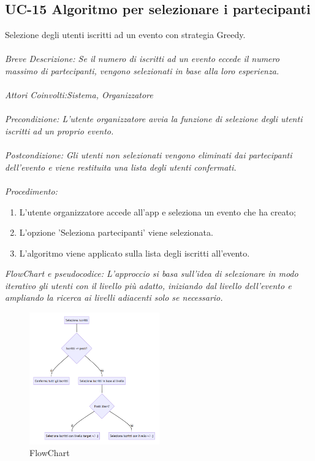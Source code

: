\subsection{UC-15 Algoritmo per selezionare i partecipanti}
Selezione degli utenti iscritti ad un evento con strategia Greedy.
\\
\\
\textit{Breve Descrizione: Se il numero di iscritti ad un evento eccede il numero massimo di partecipanti, vengono selezionati in base alla loro esperienza.} 
\\
\\
\textit{Attori Coinvolti:Sistema, Organizzatore}
\\
\\
\textit{Precondizione: L'utente organizzatore avvia la funzione di selezione degli utenti iscritti ad un proprio evento.}
\\
\\
\textit{Postcondizione: Gli utenti non selezionati vengono eliminati dai partecipanti dell'evento e viene restituita una lista degli utenti confermati.}
\\
\\
\textit{Procedimento:}
\begin{enumerate}
	\item L'utente organizzatore accede all'app e seleziona un evento che ha creato;
 	\item L'opzione 'Seleziona partecipanti' viene selezionata.
	\item L'algoritmo viene applicato sulla lista degli iscritti all'evento.
\end{enumerate}
\textit{FlowChart e pseudocodice: L'approccio si basa sull'idea di selezionare in modo iterativo gli utenti con il livello più
adatto, iniziando dal livello dell'evento e ampliando la ricerca ai livelli adiacenti solo se
necessario.}
\begin{figure}[htb]
    \centering
    \includegraphics[width = 0.5\textwidth]{Iterazione 2/images/flowchart.png}
    \caption{FlowChart}
	\label{fig:FlowChart}
\end{figure}

